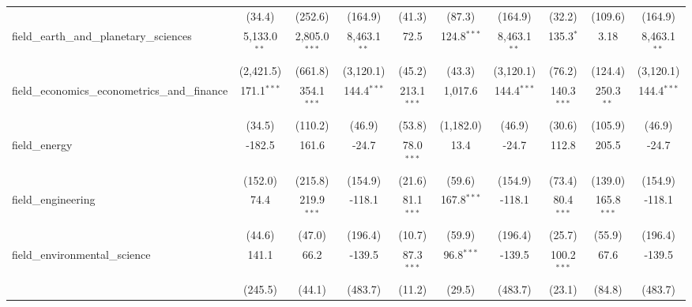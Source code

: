 \begin{tabular}{lccccccccc}
                                                               & (34.4)         & (252.6)         & (164.9)        & (41.3)        & (87.3)        & (164.9)        & (32.2)        & (109.6)         & (164.9)\\   
   field\_earth\_and\_planetary\_sciences                      & 5,133.0$^{**}$ & 2,805.0$^{***}$ & 8,463.1$^{**}$ & 72.5          & 124.8$^{***}$ & 8,463.1$^{**}$ & 135.3$^{*}$   & 3.18            & 8,463.1$^{**}$\\   
                                                               & (2,421.5)      & (661.8)         & (3,120.1)      & (45.2)        & (43.3)        & (3,120.1)      & (76.2)        & (124.4)         & (3,120.1)\\   
   field\_economics\_econometrics\_and\_finance                & 171.1$^{***}$  & 354.1$^{***}$   & 144.4$^{***}$  & 213.1$^{***}$ & 1,017.6       & 144.4$^{***}$  & 140.3$^{***}$ & 250.3$^{**}$    & 144.4$^{***}$\\   
                                                               & (34.5)         & (110.2)         & (46.9)         & (53.8)        & (1,182.0)     & (46.9)         & (30.6)        & (105.9)         & (46.9)\\   
   field\_energy                                               & -182.5         & 161.6           & -24.7          & 78.0$^{***}$  & 13.4          & -24.7          & 112.8         & 205.5           & -24.7\\   
                                                               & (152.0)        & (215.8)         & (154.9)        & (21.6)        & (59.6)        & (154.9)        & (73.4)        & (139.0)         & (154.9)\\   
   field\_engineering                                          & 74.4           & 219.9$^{***}$   & -118.1         & 81.1$^{***}$  & 167.8$^{***}$ & -118.1         & 80.4$^{***}$  & 165.8$^{***}$   & -118.1\\   
                                                               & (44.6)         & (47.0)          & (196.4)        & (10.7)        & (59.9)        & (196.4)        & (25.7)        & (55.9)          & (196.4)\\   
   field\_environmental\_science                               & 141.1          & 66.2            & -139.5         & 87.3$^{***}$  & 96.8$^{***}$  & -139.5         & 100.2$^{***}$ & 67.6            & -139.5\\   
                                                               & (245.5)        & (44.1)          & (483.7)        & (11.2)        & (29.5)        & (483.7)        & (23.1)        & (84.8)          & (483.7)\\   

\end{tabular}
